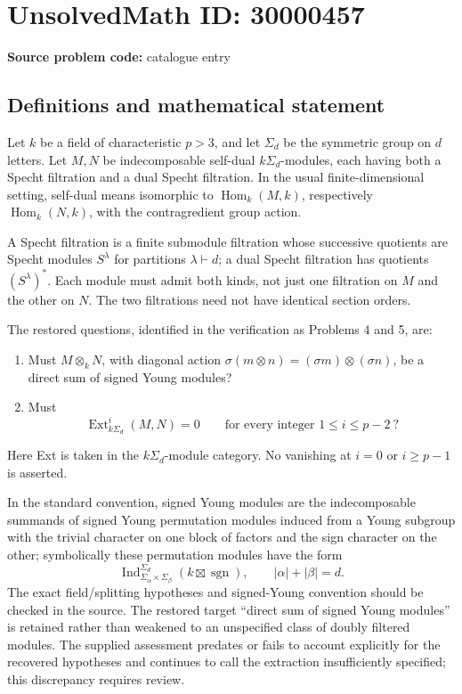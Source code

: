 \documentclass[11pt]{article}
\begin{document}
\section*{UnsolvedMath ID: 30000457}
\textbf{Source problem code:} catalogue entry
\subsection{Definitions and mathematical statement}
Let $k$ be a field of characteristic $p>3$, and let $\Sigma_d$ be the symmetric group on $d$ letters. Let $M,N$ be indecomposable self-dual $k\Sigma_d$-modules, each having both a Specht filtration and a dual Specht filtration. In the usual finite-dimensional setting, self-dual means isomorphic to $\operatorname{Hom}_k(M,k)$, respectively $\operatorname{Hom}_k(N,k)$, with the contragredient group action.

A Specht filtration is a finite submodule filtration whose successive quotients are Specht modules $S^\lambda$ for partitions $\lambda\vdash d$; a dual Specht filtration has quotients $(S^\lambda)^*$. Each module must admit both kinds, not just one filtration on $M$ and the other on $N$. The two filtrations need not have identical section orders.

The restored questions, identified in the verification as Problems 4 and 5, are:
\begin{enumerate}
\item Must $M\otimes_kN$, with diagonal action $\sigma(m\otimes n)=(\sigma m)\otimes(\sigma n)$, be a direct sum of signed Young modules?
\item Must
\[
 \operatorname{Ext}^i_{k\Sigma_d}(M,N)=0
 \qquad\text{for every integer }1\le i\le p-2\ ?
\]
\end{enumerate}
Here Ext is taken in the $k\Sigma_d$-module category. No vanishing at $i=0$ or $i\ge p-1$ is asserted.

In the standard convention, signed Young modules are the indecomposable summands of signed Young permutation modules induced from a Young subgroup with the trivial character on one block of factors and the sign character on the other; symbolically these permutation modules have the form
\[
 \operatorname{Ind}_{\Sigma_\alpha\times\Sigma_\beta}^{\Sigma_d}
       (k\boxtimes\operatorname{sgn}),\qquad |\alpha|+|\beta|=d.
\]
The exact field/splitting hypotheses and signed-Young convention should be checked in the source. The restored target ``direct sum of signed Young modules'' is retained rather than weakened to an unspecified class of doubly filtered modules. The supplied assessment predates or fails to account explicitly for the recovered hypotheses and continues to call the extraction insufficiently specified; this discrepancy requires review.
\end{document}
